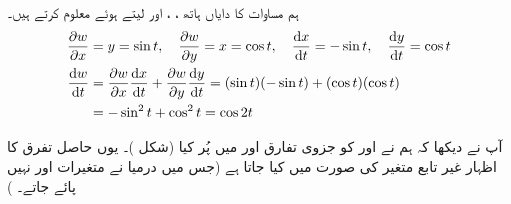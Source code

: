 ہم مساوات  کا دایاں ہاتھ  ، ،  اور  لیتے ہوئے معلوم کرتے ہیں۔
\begin{align*}
\frac{\partial w}{\partial x}&=y=\sin t,\quad \frac{\partial w}{\partial y}=x=\cos t,\quad \frac{\dif x}{\dif t}=-\sin t,\quad \frac{\dif y}{\dif t}=\cos t\\
\frac{\dif w}{\dif t}&=\frac{\partial w}{\partial x}\frac{\dif x}{\dif t}+\frac{\partial w}{\partial y}\frac{\dif y}{\dif t}=(\sin t)(-\sin t)+(\cos t)(\cos t)\\
&=-\sin^2t+\cos^2t=\cos 2t
\end{align*}

آپ نے دیکھا کہ ہم نے  اور  کو جزوی تفارق  اور  میں پُر کیا (شکل )۔ یوں حاصل تفرق   کا اظہار غیر تابع متغیر  کی صورت میں   کیا جاتا ہے (جس میں  درمیا نے    متغیرات  اور  نہیں پائے  جاتے۔ )

